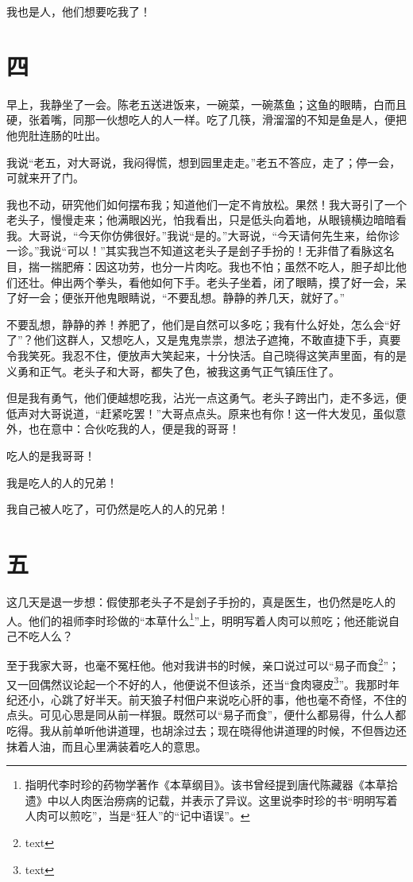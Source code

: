 \documentclass[12pt,UTF8]{ctexbook}
\begin{document}
我也是人，他们想要吃我了！

\section{四}

早上，我静坐了一会。陈老五送进饭来，一碗菜，一碗蒸鱼；这鱼的眼睛，白而且硬，张着嘴，同那一伙想吃人的人一样。吃了几筷，滑溜溜的不知是鱼是人，便把他兜肚连肠的吐出。

我说“老五，对大哥说，我闷得慌，想到园里走走。”老五不答应，走了；停一会，可就来开了门。

我也不动，研究他们如何摆布我；知道他们一定不肯放松。果然！我大哥引了一个老头子，慢慢走来；他满眼凶光，怕我看出，只是低头向着地，从眼镜横边暗暗看我。大哥说，“今天你仿佛很好。”我说“是的。”大哥说，“今天请何先生来，给你诊一诊。”我说“可以！”其实我岂不知道这老头子是刽子手扮的！无非借了看脉这名目，揣一揣肥瘠：因这功劳，也分一片肉吃。我也不怕；虽然不吃人，胆子却比他们还壮。伸出两个拳头，看他如何下手。老头子坐着，闭了眼睛，摸了好一会，呆了好一会；便张开他鬼眼睛说，“不要乱想。静静的养几天，就好了。”

不要乱想，静静的养！养肥了，他们是自然可以多吃；我有什么好处，怎么会“好了”？他们这群人，又想吃人，又是鬼鬼祟祟，想法子遮掩，不敢直捷下手，真要令我笑死。我忍不住，便放声大笑起来，十分快活。自己晓得这笑声里面，有的是义勇和正气。老头子和大哥，都失了色，被我这勇气正气镇压住了。

但是我有勇气，他们便越想吃我，沾光一点这勇气。老头子跨出门，走不多远，便低声对大哥说道，“赶紧吃罢！”大哥点点头。原来也有你！这一件大发见，虽似意外，也在意中：合伙吃我的人，便是我的哥哥！

吃人的是我哥哥！

我是吃人的人的兄弟！

我自己被人吃了，可仍然是吃人的人的兄弟！

\section{五}

这几天是退一步想：假使那老头子不是刽子手扮的，真是医生，也仍然是吃人的人。他们的祖师李时珍做的“本草什么\footnote{指明代李时珍的药物学著作《本草纲目》。该书曾经提到唐代陈藏器《本草拾遗》中以人肉医治痨病的记载，并表示了异议。这里说李时珍的书“明明写着人肉可以煎吃”，当是“狂人”的“记中语误”。}”上，明明写着人肉可以煎吃；他还能说自己不吃人么？

至于我家大哥，也毫不冤枉他。他对我讲书的时候，亲口说过可以“易子而食\footnote{text}”；又一回偶然议论起一个不好的人，他便说不但该杀，还当“食肉寝皮\footnote{text}”。我那时年纪还小，心跳了好半天。前天狼子村佃户来说吃心肝的事，他也毫不奇怪，不住的点头。可见心思是同从前一样狠。既然可以“易子而食”，便什么都易得，什么人都吃得。我从前单听他讲道理，也胡涂过去；现在晓得他讲道理的时候，不但唇边还抹着人油，而且心里满装着吃人的意思。
\end{document}
